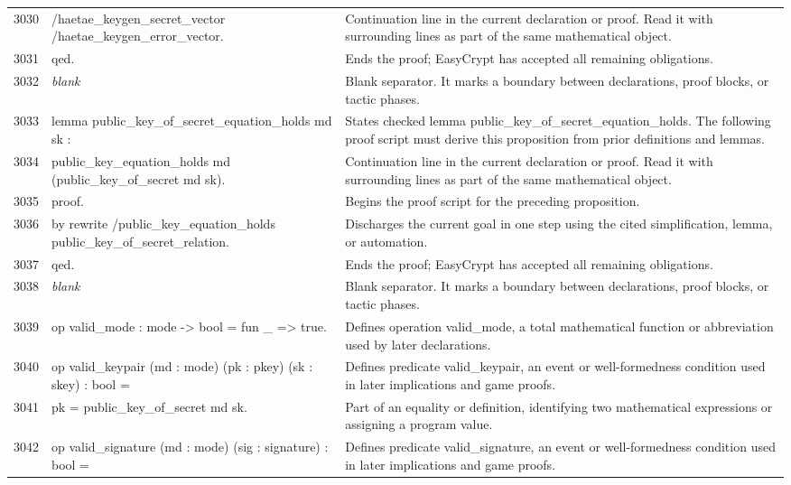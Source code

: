\documentclass[10pt]{article}
\begin{document}
\begin{longtable}{r L{0.53\textwidth} L{0.37\textwidth}}
3030 & {\ttfamily\scriptsize            /haetae\_keygen\_secret\_vector /haetae\_keygen\_error\_vector.} & Continuation line in the current declaration or proof.  Read it with surrounding lines as part of the same mathematical object. \\
3031 & {\ttfamily\scriptsize qed.} & Ends the proof; EasyCrypt has accepted all remaining obligations. \\
3032 & {\ttfamily\scriptsize \emph{blank}} & Blank separator.  It marks a boundary between declarations, proof blocks, or tactic phases. \\
3033 & {\ttfamily\scriptsize lemma public\_key\_of\_secret\_equation\_holds md sk :} & States checked lemma public\_key\_of\_secret\_equation\_holds.  The following proof script must derive this proposition from prior definitions and lemmas. \\
3034 & {\ttfamily\scriptsize   public\_key\_equation\_holds md (public\_key\_of\_secret md sk).} & Continuation line in the current declaration or proof.  Read it with surrounding lines as part of the same mathematical object. \\
3035 & {\ttfamily\scriptsize proof.} & Begins the proof script for the preceding proposition. \\
3036 & {\ttfamily\scriptsize by rewrite /public\_key\_equation\_holds public\_key\_of\_secret\_relation.} & Discharges the current goal in one step using the cited simplification, lemma, or automation. \\
3037 & {\ttfamily\scriptsize qed.} & Ends the proof; EasyCrypt has accepted all remaining obligations. \\
3038 & {\ttfamily\scriptsize \emph{blank}} & Blank separator.  It marks a boundary between declarations, proof blocks, or tactic phases. \\
3039 & {\ttfamily\scriptsize op valid\_mode : mode -> bool = fun \_ => true.} & Defines operation valid\_mode, a total mathematical function or abbreviation used by later declarations. \\
3040 & {\ttfamily\scriptsize op valid\_keypair (md : mode) (pk : pkey) (sk : skey) : bool =} & Defines predicate valid\_keypair, an event or well-formedness condition used in later implications and game proofs. \\
3041 & {\ttfamily\scriptsize   pk = public\_key\_of\_secret md sk.} & Part of an equality or definition, identifying two mathematical expressions or assigning a program value. \\
3042 & {\ttfamily\scriptsize op valid\_signature (md : mode) (sig : signature) : bool =} & Defines predicate valid\_signature, an event or well-formedness condition used in later implications and game proofs. \\

\end{longtable}
\end{document}
